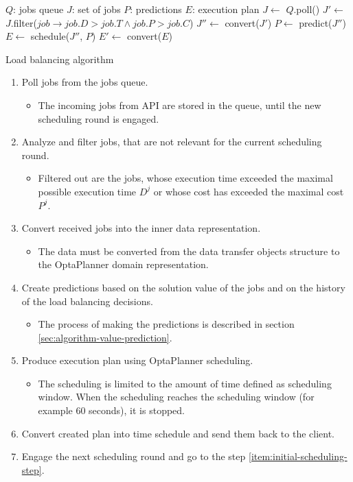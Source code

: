 \bigskip
\begin{algorithm}[H]
	\SetAlgoLined
	$Q$: jobs queue\;
	$J$: set of jobs\;
	$P$: predictions\;
	$E$: execution plan\;
	\BlankLine
	$J \leftarrow$ $Q$.poll()\;
	$J'\leftarrow$ $J$.filter($job \rightarrow job.D > job.T \wedge job.P > job.C$)\;
	$J'' \leftarrow$ convert($J'$)\;
	$P \leftarrow$ predict($J''$)\;
	$E \leftarrow$ schedule($J''$, $P$)\;
	$E' \leftarrow$ convert($E$)\;
	\caption{Load balancing algorithm}
	\label{alg:load-balancing-alg}
\end{algorithm} 
\medskip
\begin{enumerate}
	\itemsep0pt
	\item \label{item:initial-scheduling-step} Poll jobs from the jobs queue.
	\begin{itemize}
		\item The incoming jobs from API are stored in the queue, 
		until the new scheduling round is engaged.
	\end{itemize}

	\item Analyze and filter jobs, that are not relevant for the current scheduling round.
	\begin{itemize}
		\item Filtered out are the jobs,
		 whose execution time exceeded the maximal possible execution time $D^{j}$
		 or whose cost has exceeded the maximal cost $P^{j}$.
	\end{itemize}

	\item \label{item:convert-to-scheduling-step} Convert received jobs into the inner data representation.
	\begin{itemize}
		\item The data must be converted from the data transfer objects structure
		to the OptaPlanner domain representation.
	\end{itemize}

	\item \label{item:predictions-scheduling-step} Create predictions based on the solution value of the jobs 
	and on the history of the load balancing decisions.
	\begin{itemize}
		\item The process of making the predictions is described in section \ref{sec:algorithm-value-prediction}.
	\end{itemize}

	\item \label{item:scheduling-step} Produce execution plan using OptaPlanner scheduling.
	\begin{itemize}
		\item The scheduling is limited to the amount of time defined as scheduling window.
		When the scheduling reaches the scheduling window (for example 60 seconds),
		it is stopped.
	\end{itemize}

	\item \label{item:convert-back-scheduling-step} Convert created plan into time schedule and send them back to the client.

	\item Engage the next scheduling round and go to the step \ref{item:initial-scheduling-step}.
\end{enumerate}	
